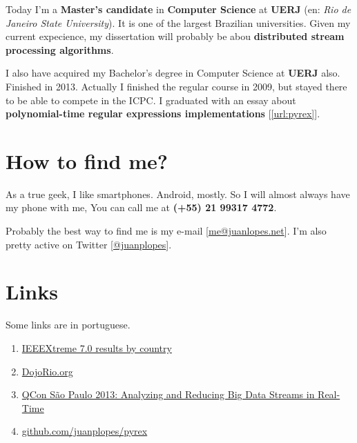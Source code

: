 \documentclass[a4paper,12pt,oneside]{article}
\begin{document}
	Today I'm a \textbf{Master's candidate} in \textbf{Computer Science} at \textbf{UERJ} (en: \emph{Rio de Janeiro State University}). It is one of the largest Brazilian universities. Given my current expecience, my dissertation will probably be abou \textbf{distributed stream processing algorithms}.

	I also have acquired my Bachelor's degree in Computer Science at \textbf{UERJ} also. Finished in 2013. Actually I finished the regular course in 2009, but stayed there to be able to compete in the ICPC. I graduated with an essay about \textbf{polynomial-time regular expressions implementations} [\ref{url:pyrex}].

\section*{How to find me?}

	As a true geek, I like smartphones. Android, mostly. So I will almost always have my phone with me, You can call me at \textbf{(+55) 21 99317 4772}.
	
	Probably the best way to find me is my e-mail [\href{mailto:me@juanlopes.net}{me@juanlopes.net}]. I'm also pretty active on Twitter [\href{http://twitter.com/juanplopes}{@juanplopes}].

\section*{Links}

	Some links are in portuguese.

\begin{enumerate}

  \item \label{url:ieeextreme} \href{http://www.ieee.org/membership_services/membership/students/competitions/xtreme/xtreme7_final_rankings-country.pdf}{IEEEXtreme 7.0 results by country}
  \item \label{url:dojorio} \href{http://dojorio.org/}{DojoRio.org}
  \item \label{url:qconsp2013} \href{http://www.infoq.com/br/presentations/analisando-fluxo-dados-tempo-real}{QCon São Paulo 2013: Analyzing and Reducing Big Data Streams in Real-Time}
  \item \label{url:pyrex} \href{http://github.com/juanplopes/pyrex}{github.com/juanplopes/pyrex}
\end{enumerate}
\end{document}
